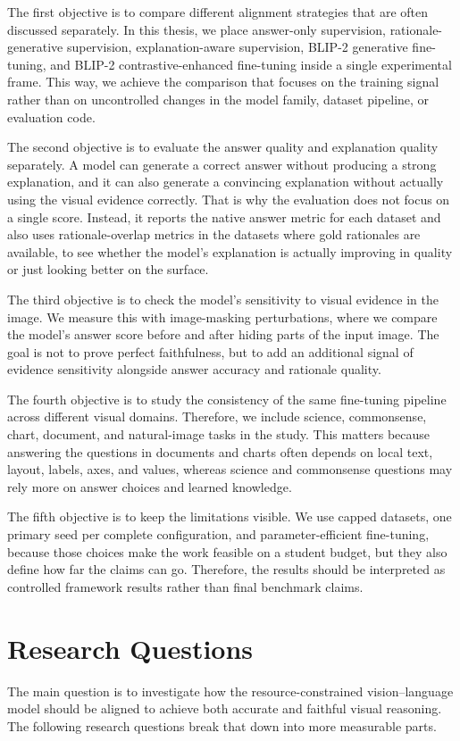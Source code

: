 \documentclass[12pt,bibliography=totoc,listof=totoc,BCOR=5mm,DIV=12,oneside,open=any]{scrbook}
\begin{document}
The first objective is to compare different alignment strategies that are often discussed separately.
In this thesis, we place answer-only supervision, rationale-generative supervision,
explanation-aware supervision, BLIP-2 generative fine-tuning, and BLIP-2 contrastive-enhanced fine-tuning inside a single experimental frame.
This way, we achieve the comparison that focuses on the training signal rather than on uncontrolled changes in the model family, dataset pipeline, or evaluation code.

The second objective is to evaluate the answer quality and explanation quality separately.
A model can generate a correct answer without producing a strong explanation,
and it can also generate a convincing explanation without actually using the visual evidence correctly.
That is why the evaluation does not focus on a single score.
Instead, it reports the native answer metric for each dataset and also uses rationale-overlap metrics in 
the datasets where gold rationales are available, to see whether the model's explanation is actually improving in quality or just looking better on the surface.

The third objective is to check the model's sensitivity to visual evidence in the image.
We measure this with image-masking perturbations, where we compare the model's answer score before and after hiding parts of the input image.
The goal is not to prove perfect faithfulness, but to add an additional signal of evidence sensitivity alongside answer accuracy and rationale quality.

The fourth objective is to study the consistency of the same fine-tuning pipeline across different visual domains.
Therefore, we include science, commonsense, chart, document, and natural-image tasks in the study.
This matters because answering the questions in documents and charts often depends on local text, layout, labels, axes, and values,
whereas science and commonsense questions may rely more on answer choices and learned knowledge.

The fifth objective is to keep the limitations visible.
We use capped datasets, one primary seed per complete configuration, and parameter-efficient fine-tuning,
because those choices make the work feasible on a student budget, but they also define how far the claims can go.
Therefore, the results should be interpreted as controlled framework results rather than final benchmark claims.


\section{Research Questions}
The main question is to investigate how the resource-constrained vision--language model should be aligned to achieve both accurate and faithful visual reasoning.
The following research questions break that down into more measurable parts.
\end{document}
